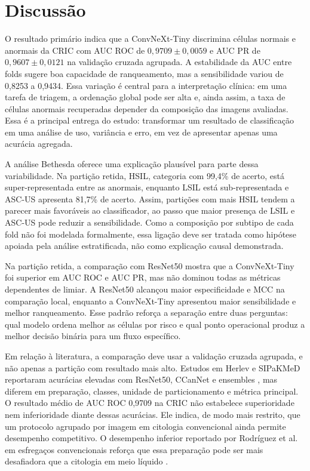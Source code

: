 \section{Discussão}

O resultado primário indica que a ConvNeXt-Tiny discrimina células normais e
anormais da CRIC com AUC ROC de $0{,}9709\pm0{,}0059$ e AUC PR de
$0{,}9607\pm0{,}0121$ na validação cruzada agrupada. A estabilidade da AUC entre
folds sugere boa capacidade de ranqueamento, mas a sensibilidade variou de
0,8253 a 0,9434. Essa variação é central para a interpretação clínica: em uma
tarefa de triagem, a ordenação global pode ser alta e, ainda assim, a taxa de
células anormais recuperadas depender da composição das imagens avaliadas.
Essa é a principal entrega do estudo: transformar um resultado de
classificação em uma análise de uso, variância e erro, em vez de apresentar
apenas uma acurácia agregada.

A análise Bethesda oferece uma explicação plausível para parte dessa
variabilidade. Na partição retida, HSIL, categoria com 99,4\% de acerto, está
super-representada entre as anormais, enquanto LSIL está sub-representada e
ASC-US apresenta 81,7\% de acerto. Assim, partições com mais HSIL tendem a
parecer mais favoráveis ao classificador, ao passo que maior presença de LSIL e
ASC-US pode reduzir a sensibilidade. Como a composição por subtipo de cada fold
não foi modelada formalmente, essa ligação deve ser tratada como hipótese
apoiada pela análise estratificada, não como explicação causal demonstrada.

Na partição retida, a comparação com ResNet50 mostra que a ConvNeXt-Tiny foi
superior em AUC ROC e AUC PR, mas não dominou todas as métricas dependentes de
limiar. A ResNet50 alcançou maior especificidade e MCC na comparação local,
enquanto a ConvNeXt-Tiny apresentou maior sensibilidade e melhor ranqueamento.
Esse padrão reforça a separação entre duas perguntas: qual modelo ordena melhor
as células por risco e qual ponto operacional produz a melhor decisão binária
para um fluxo específico.

Em relação à literatura, a comparação deve usar a validação cruzada agrupada, e
não apenas a partição com resultado mais alto. Estudos em Herlev e SIPaKMeD
reportaram acurácias elevadas com ResNet50, CCanNet e ensembles
\cite{kaur2025comparison,mehedi2024lightweight,lima2025ensemble}, mas diferem
em preparação, classes, unidade de particionamento e métrica principal. O
resultado médio de AUC ROC 0,9709 na CRIC não estabelece superioridade nem
inferioridade diante dessas acurácias. Ele indica, de modo mais restrito, que
um protocolo agrupado por imagem em citologia convencional ainda permite
desempenho competitivo. O desempenho inferior reportado por Rodríguez et al. em
esfregaços convencionais reforça que essa preparação pode ser mais desafiadora
que a citologia em meio líquido \cite{rodriguez2024automated}.

